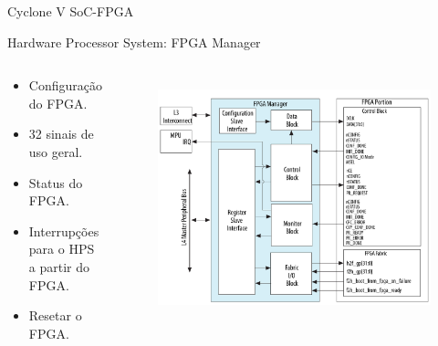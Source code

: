 \documentclass[10pt]{beamer}
\begin{document}
\begin{frame}{Cyclone V SoC-FPGA}
	\begin{alertblock}{Hardware Processor System: FPGA Manager}
		\begin{columns}
			\begin{alertblock}{}
				\begin{itemize}
					\setlength\itemsep{0.8em}
					\item Configuração do FPGA.
					\item 32 sinais de uso geral.
					\item Status do FPGA.
					\item Interrupções para o HPS a partir do FPGA.
					\item Resetar o FPGA.
				\end{itemize}
			\end{alertblock}
			\begin{figure}[h]
				\begin{center}
					\includegraphics[scale=0.18]{imagens/fpgamanager.png}\\
				\end{center}
				\label{fig:fpgamanager}
			\end{figure}
		\end{columns}
	\end{alertblock}
\end{frame}
\end{document}
